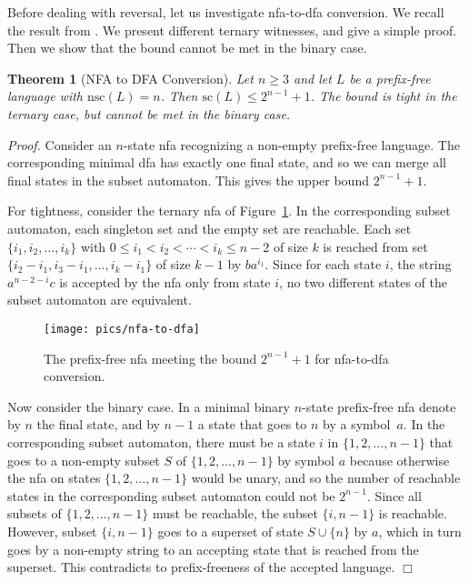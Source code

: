 \documentclass[copyright]{eptcs}
\newtheorem{theorem}{Theorem}
\newcommand{\nsc}{\mathrm{nsc}}
\renewcommand{\sc}{\mathrm{sc}}
\renewcommand{\le}{\leqslant}
\renewcommand{\ge}{\geqslant}
\begin{document}
 Before dealing with reversal, let us investigate  nfa-to-dfa conversion.
 We recall the result from \cite[Theorem 19, which uses the proof of Theorem 6,
 which in turn uses Moore's proof in \cite{mo71}]{bhk09}.
 We present different ternary witnesses, and give a simple proof. 
 Then we show that the  bound cannot be met in the binary case.

 \begin{theorem}[NFA to DFA Conversion]\label{thm:nfa-to-dfa}
  Let $n\ge 3$ and let $L$ be a prefix-free language  with $\nsc(L)=n$.
  Then $\sc(L)\le 2^{n-1}+1$.
  The bound is tight in the ternary case,  but cannot be met in the binary case.
 \end{theorem}

 \noindent\emph{Proof.}
  Consider an $n$-state nfa recognizing a non-empty prefix-free language.
  The corresponding minimal dfa has
  exactly one final state,
  and so we can merge all final states in the subset automaton.
  This gives the upper bound $2^{n-1}+1$.

  For tightness, consider the ternary nfa of Figure~\ref{fig:nfa-to-dfa}.
  In the corresponding subset automaton,
  each singleton set and the empty set are reachable.
  Each set $\{i_1,i_2,\ldots,i_k\}$ with $0\le i_1 <i_2< \cdots < i_k\le n-2$
  of size $k$   is reached from 
  set $\{i_2-i_1,i_3-i_1,\ldots,i_k-i_1\}$ of size $k-1$ by $ba^{i_1}$.
  Since for each state $i$, the string $a^{n-2-i}c$
  is accepted by the nfa only from state $i$,
  no two different states of the subset automaton are equivalent.

  \begin{figure}[b]
  \centerline{\texttt{[image: pics/nfa-to-dfa]}}
  \caption{The prefix-free  nfa
            meeting the  bound $2^{n-1}+1$ for nfa-to-dfa conversion.}
  \label{fig:nfa-to-dfa}
  \end{figure}

  Now consider the binary case.
  In a minimal binary $n$-state prefix-free nfa
  denote by  $n$ the final state,
  and by $n-1$ a state that goes to $n$ by a symbol~$a$.
  In the corresponding subset automaton,
  there must be a state $i$ in $\{1,2,\ldots,n-1\}$
  that goes to a non-empty subset $S$ of $\{1,2,\ldots,n-1\}$  
  by symbol $a$ because otherwise
  the nfa on states $\{1,2,\ldots,n-1\}$ would be unary, and so
  the number of reachable states in the corresponding subset automaton
  could not be $2^{n-1}$.
  Since all subsets of $\{1,2,\ldots,n-1\}$
  must be reachable, the subset $\{i,n-1\}$ is reachable.
  However,  subset $\{i,n-1\}$ goes to a superset of state $S\cup\{n\}$ by $a$,
  which in turn goes by a non-empty string  
  to an accepting state that is reached from the superset.
  This contradicts to prefix-freeness of the accepted language.
 \hfill$\Box$\medskip
\end{document}
